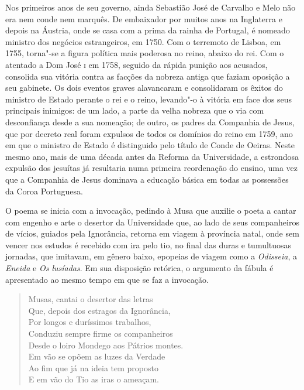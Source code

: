 Nos primeiros anos de seu governo, ainda Sebastião José de Carvalho e Melo não
era nem conde nem marquês.  De embaixador por muitos anos na Inglaterra e depois
na Áustria, onde se casa com a prima da rainha de Portugal, é nomeado ministro
dos negócios estrangeiros, em 1750.  Com o terremoto de Lisboa, em 1755,
torna"-se a figura política mais poderosa no reino, abaixo do rei. Com o atentado
a Dom José \textsc{i} em 1758, seguido da rápida punição aos acusados, consolida
sua vitória contra as facções da nobreza antiga que faziam oposição a seu
gabinete. Os dois eventos graves alavancaram e consolidaram os êxitos do
ministro de Estado perante o rei e o reino, \mbox{levando"-o} à vitória em face dos seus
principais inimigos: de um lado, a parte da velha nobreza que o via com
desconfiança desde a sua nomeação; de outro, os padres da Companhia de Jesus,
que por decreto real foram expulsos de todos os domínios do reino em 1759, ano
em que o ministro de Estado é distinguido pelo título de Conde de Oeiras.  Neste
mesmo ano, mais de uma década antes da Reforma da Universidade, a estrondosa
expulsão dos jesuítas já resultaria numa primeira reordenação do ensino, uma vez
que a Companhia de Jesus dominava a educação básica em todas as possessões da
Coroa Portuguesa.

O poema se inicia com a invocação, pedindo à Musa que auxilie o poeta a cantar
com engenho e arte o desertor da Universidade que, ao lado de seus companheiros
de vícios, guiados pela Ignorância, retorna em viagem à província natal, onde
sem vencer nos estudos é recebido com ira pelo tio, no final das duras e
tumultuosas jornadas, que imitavam, em gênero baixo, epopeias de viagem como a
\textit{Odisseia}, a \textit{Eneida} e \textit{Os lusíadas}.  Em sua disposição
retórica, o argumento da fábula é apresentado ao mesmo tempo em que se faz a
invocação. 

\begin{verse}
Musas, cantai o desertor das letras \\
Que, depois dos estragos da Ignorância, \\
Por longos e duríssimos trabalhos, \\ 
Conduziu sempre firme os companheiros \\
Desde o loiro Mondego aos Pátrios montes. \\ 
Em vão se opõem as luzes da Verdade \\
Ao fim que já  na ideia tem proposto  \\
E em vão do Tio as iras o ameaçam. \\
\end{verse}	  

